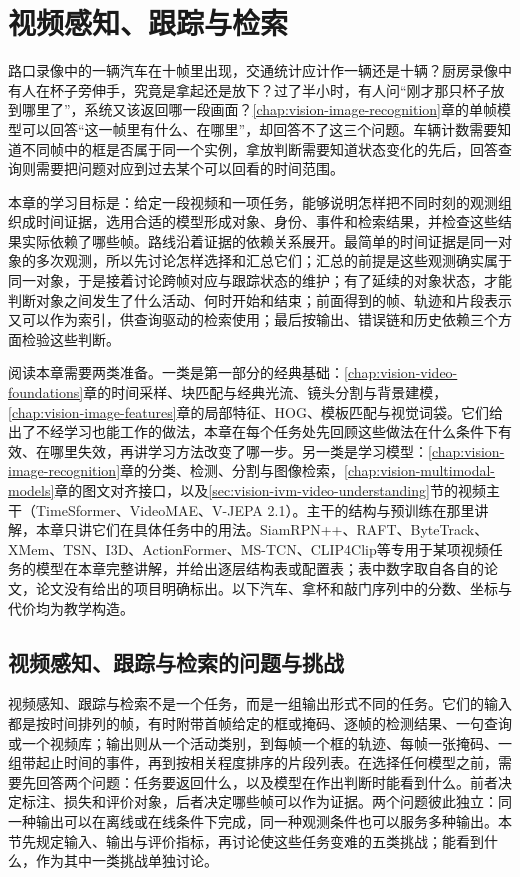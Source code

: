 \chapter{视频感知、跟踪与检索}
\label{chap:vision-video-recognition}

路口录像中的一辆汽车在十帧里出现，交通统计应计作一辆还是十辆？厨房录像中有人在杯子旁伸手，究竟是拿起还是放下？过了半小时，有人问“刚才那只杯子放到哪里了”，系统又该返回哪一段画面？\ref{chap:vision-image-recognition}章的单帧模型可以回答“这一帧里有什么、在哪里”，却回答不了这三个问题。车辆计数需要知道不同帧中的框是否属于同一个实例，拿放判断需要知道状态变化的先后，回答查询则需要把问题对应到过去某个可以回看的时间范围。

本章的学习目标是：给定一段视频和一项任务，能够说明怎样把不同时刻的观测组织成时间证据，选用合适的模型形成对象、身份、事件和检索结果，并检查这些结果实际依赖了哪些帧。路线沿着证据的依赖关系展开。最简单的时间证据是同一对象的多次观测，所以先讨论怎样选择和汇总它们；汇总的前提是这些观测确实属于同一对象，于是接着讨论跨帧对应与跟踪状态的维护；有了延续的对象状态，才能判断对象之间发生了什么活动、何时开始和结束；前面得到的帧、轨迹和片段表示又可以作为索引，供查询驱动的检索使用；最后按输出、错误链和历史依赖三个方面检验这些判断。

阅读本章需要两类准备。一类是第一部分的经典基础：\ref{chap:vision-video-foundations}章的时间采样、块匹配与经典光流、镜头分割与背景建模，\ref{chap:vision-image-features}章的局部特征、HOG、模板匹配与视觉词袋。它们给出了不经学习也能工作的做法，本章在每个任务处先回顾这些做法在什么条件下有效、在哪里失效，再讲学习方法改变了哪一步。另一类是学习模型：\ref{chap:vision-image-recognition}章的分类、检测、分割与图像检索，\ref{chap:vision-multimodal-models}章的图文对齐接口，以及\ref{sec:vision-ivm-video-understanding}节的视频主干（TimeSformer、VideoMAE、V-JEPA 2.1）。主干的结构与预训练在那里讲解，本章只讲它们在具体任务中的用法。SiamRPN++、RAFT、ByteTrack、XMem、TSN、I3D、ActionFormer、MS-TCN、CLIP4Clip等专用于某项视频任务的模型在本章完整讲解，并给出逐层结构表或配置表；表中数字取自各自的论文，论文没有给出的项目明确标出。以下汽车、拿杯和敲门序列中的分数、坐标与代价均为教学构造。

\section{视频感知、跟踪与检索的问题与挑战}
\label{sec:vision-video-recognition-challenges}
\label{sec:vision-video-information}

视频感知、跟踪与检索不是一个任务，而是一组输出形式不同的任务。它们的输入都是按时间排列的帧，有时附带首帧给定的框或掩码、逐帧的检测结果、一句查询或一个视频库；输出则从一个活动类别，到每帧一个框的轨迹、每帧一张掩码、一组带起止时间的事件，再到按相关程度排序的片段列表。在选择任何模型之前，需要先回答两个问题：任务要返回什么，以及模型在作出判断时能看到什么。前者决定标注、损失和评价对象，后者决定哪些帧可以作为证据。两个问题彼此独立：同一种输出可以在离线或在线条件下完成，同一种观测条件也可以服务多种输出。本节先规定输入、输出与评价指标，再讨论使这些任务变难的五类挑战；能看到什么，作为其中一类挑战单独讨论。

